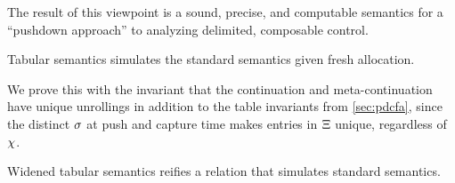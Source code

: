 The result of this viewpoint is a sound, precise, and computable semantics for a ``pushdown approach'' to analyzing delimited, composable control.

\begin{claim}\label{thm:concrete-sr}
  Tabular semantics simulates the standard semantics given fresh allocation.
\end{claim}

We prove this with the invariant that the continuation and meta-continuation have unique unrollings in addition to the table invariants from \autoref{sec:pdcfa}, since the distinct $\sigma$ at push and capture time makes entries in $\Xi$ unique, regardless of $\chi$.

\begin{claim}\label{thm:sound-sr}
  Widened tabular semantics reifies a relation that simulates standard semantics.
\end{claim}

